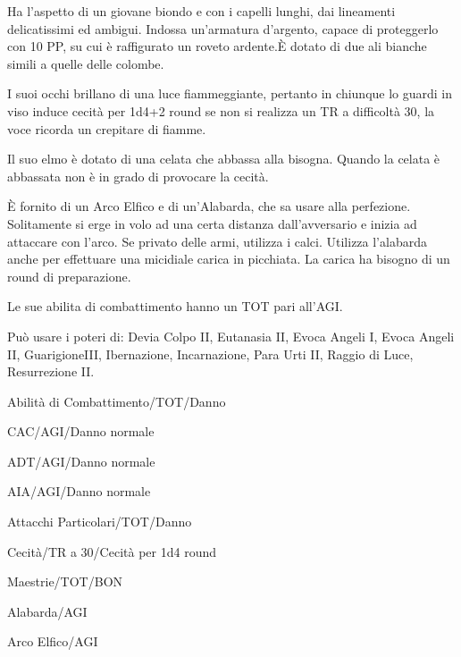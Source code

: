 
Ha l'aspetto di un giovane biondo e con i capelli lunghi, dai
lineamenti delicatissimi ed ambigui. Indossa un'armatura d'argento,
capace di proteggerlo con 10 PP, su cui \`e raffigurato un roveto
ardente.\`E dotato di due ali bianche simili a quelle delle colombe.

I suoi occhi brillano di una luce fiammeggiante, pertanto in chiunque
lo guardi in viso induce cecit\`a per 1d4+2 round se non si realizza
un TR a difficolt\`a 30, la voce ricorda un crepitare di fiamme.

Il suo elmo \`e dotato di una celata che abbassa alla bisogna.
Quando la celata \`e abbassata non \`e in grado di provocare la
cecit\`a. 

\`E fornito di un Arco Elfico e di un'Alabarda, che sa
usare alla perfezione. Solitamente si erge in volo ad una certa
distanza dall'avversario e inizia ad attaccare con l'arco. Se privato
delle armi, utilizza i calci. Utilizza l'alabarda anche per effettuare
una micidiale carica in picchiata. La carica ha bisogno di un round di
preparazione.

Le sue abilita di combattimento hanno un TOT pari all'AGI.

Pu\`o usare i poteri di: Devia Colpo II, Eutanasia II, Evoca Angeli I, Evoca
Angeli II, GuarigioneIII, Ibernazione, Incarnazione, Para Urti II, Raggio di
Luce, Resurrezione II. 


\begin{parmostro}{Abilit\`a di Combattimento/TOT/Danno}
\item CAC/AGI/Danno normale
\item ADT/AGI/Danno normale
\item AIA/AGI/Danno normale
\end{parmostro}

\begin{parmostro}{Attacchi Particolari/TOT/Danno}
\item Cecit\`a/TR a 30/Cecit\`a per 1d4
  round
\end{parmostro}

\begin{parmostro}{Maestrie/TOT/BON}
\item Alabarda/AGI 
\item Arco Elfico/AGI  
\end{parmostro}

